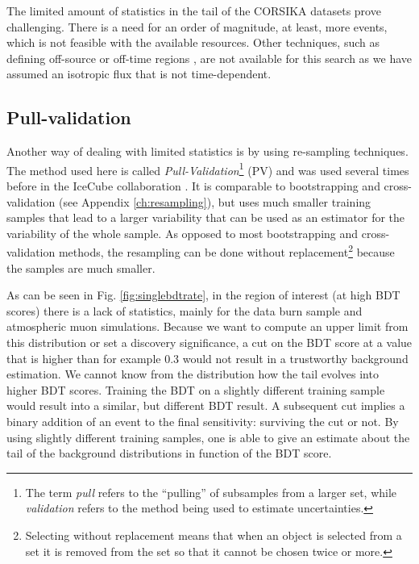 \noindent The limited amount of statistics in the tail of the CORSIKA datasets prove challenging. There is a need for an order of magnitude, at least, more events, which is not feasible with the available resources. Other techniques, such as defining off-source or off-time regions \cite{1352676}, are not available for this search as we have assumed an isotropic flux that is not time-dependent.



\subsection{Pull-validation}
\label{subsec:pv}
Another way of dealing with limited statistics is by using re-sampling techniques. The method used here is called \textit{Pull-Validation}\footnote{The term \textit{pull} refers to the ``pulling'' of subsamples from a larger set, while \textit{validation} refers to the method being used to estimate uncertainties.} (PV) and was used several times before in the IceCube collaboration \cite{Aartsen:2016fep,Aartsen:2015exf,scheriauthesis}. It is comparable to bootstrapping and cross-validation (see Appendix \ref{ch:resampling}), but uses much smaller training samples that lead to a larger variability that can be used as an estimator for the variability of the whole sample. As opposed to most bootstrapping and cross-validation methods, the resampling can be done without replacement\footnote{Selecting without replacement means that when an object is selected from a set it is removed from the set so that it cannot be chosen twice or more.} because the samples are much smaller.

As can be seen in Fig. \ref{fig:singlebdtrate}, in the region of interest (at high BDT scores) there is a lack of statistics, mainly for the data burn sample and atmospheric muon simulations. Because we want to compute an upper limit from this distribution or set a discovery significance, a cut on the BDT score at a value that is higher than for example 0.3 would not result in a trustworthy background estimation. We cannot know from the distribution how the tail evolves into higher BDT scores. Training the BDT on a slightly different training sample would result into a similar, but different BDT result. A subsequent cut implies a binary addition of an event to the final sensitivity: surviving the cut or not. By using slightly different training samples, one is able to give an estimate about the tail of the background distributions in function of the BDT score.\\

